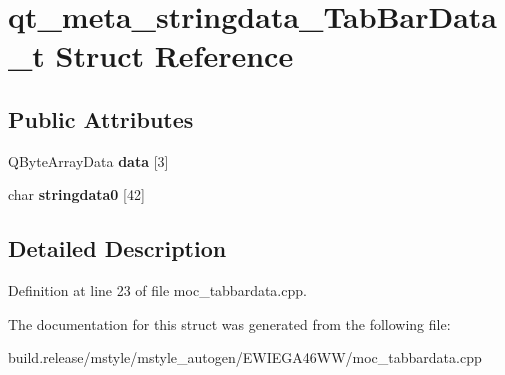 \hypertarget{structqt__meta__stringdata___tab_bar_data__t}{}\section{qt\+\_\+meta\+\_\+stringdata\+\_\+\+Tab\+Bar\+Data\+\_\+t Struct Reference}
\label{structqt__meta__stringdata___tab_bar_data__t}
\subsection*{Public Attributes}
\begin{DoxyCompactItemize}
\item 
\mbox{\label{structqt__meta__stringdata___tab_bar_data__t_a6317862449eb86b06ad66727236c13a6}} 
Q\+Byte\+Array\+Data {\bfseries data} \mbox{[}3\mbox{]}
\item 
\mbox{\label{structqt__meta__stringdata___tab_bar_data__t_ab295750f3ae67fc69b81427c786f7c01}} 
char {\bfseries stringdata0} \mbox{[}42\mbox{]}
\end{DoxyCompactItemize}


\subsection{Detailed Description}


Definition at line 23 of file moc\+\_\+tabbardata.\+cpp.



The documentation for this struct was generated from the following file\+:\begin{DoxyCompactItemize}
\item 
build.\+release/mstyle/mstyle\+\_\+autogen/\+E\+W\+I\+E\+G\+A46\+W\+W/moc\+\_\+tabbardata.\+cpp\end{DoxyCompactItemize}
